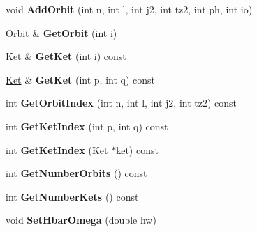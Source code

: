 \begin{DoxyCompactItemize}
\item 
\hypertarget{classModelSpace_aad3b42327ba5e1d67569cc31f30c7070}{void {\bfseries Add\-Orbit} (int n, int l, int j2, int tz2, int ph, int io)}\label{classModelSpace_aad3b42327ba5e1d67569cc31f30c7070}

\item 
\hypertarget{classModelSpace_a9a958612b1dcf52caf0bf16539026bb4}{\hyperlink{classOrbit}{Orbit} \& {\bfseries Get\-Orbit} (int i)}\label{classModelSpace_a9a958612b1dcf52caf0bf16539026bb4}

\item 
\hypertarget{classModelSpace_adc36e64fb3bb4dc76819f91e9057844f}{\hyperlink{classKet}{Ket} \& {\bfseries Get\-Ket} (int i) const }\label{classModelSpace_adc36e64fb3bb4dc76819f91e9057844f}

\item 
\hypertarget{classModelSpace_ab3662f5e12ce6da0164c8adbe1abbb95}{\hyperlink{classKet}{Ket} \& {\bfseries Get\-Ket} (int p, int q) const }\label{classModelSpace_ab3662f5e12ce6da0164c8adbe1abbb95}

\item 
\hypertarget{classModelSpace_ab3d8cb8214e082773caa5820773ee16e}{int {\bfseries Get\-Orbit\-Index} (int n, int l, int j2, int tz2) const }\label{classModelSpace_ab3d8cb8214e082773caa5820773ee16e}

\item 
\hypertarget{classModelSpace_ad2622b2d268c55b89a2082189f7185b1}{int {\bfseries Get\-Ket\-Index} (int p, int q) const }\label{classModelSpace_ad2622b2d268c55b89a2082189f7185b1}

\item 
\hypertarget{classModelSpace_ae87e8738f2aed2f23eab933b77a3772f}{int {\bfseries Get\-Ket\-Index} (\hyperlink{classKet}{Ket} $\ast$ket) const }\label{classModelSpace_ae87e8738f2aed2f23eab933b77a3772f}

\item 
\hypertarget{classModelSpace_a48004a4a3d559081827da87c9c4bfe94}{int {\bfseries Get\-Number\-Orbits} () const }\label{classModelSpace_a48004a4a3d559081827da87c9c4bfe94}

\item 
\hypertarget{classModelSpace_a2a46d43beb6d4e2de8c978ff921f4047}{int {\bfseries Get\-Number\-Kets} () const }\label{classModelSpace_a2a46d43beb6d4e2de8c978ff921f4047}

\item 
\hypertarget{classModelSpace_abc4f6a563b71977d1e0a99eb5367a2d7}{void {\bfseries Set\-Hbar\-Omega} (double hw)}\label{classModelSpace_abc4f6a563b71977d1e0a99eb5367a2d7}


\end{DoxyCompactItemize}

